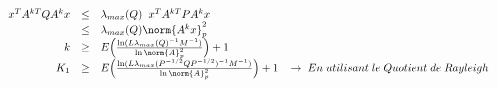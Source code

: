 \begin{equation}
\begin{array}{rrcl}
  & x^{T} A^{kT} Q A^{k} x   & \leq  &   \lambda_{max}(Q)\;\; x^{T} A^{kT} P A^{k} x \\
  
     &  &  \leq &  \lambda_{max}(Q) \norm{A^{k}x }^{2}_{p} \\
         
    
                & k &  \geq & E \Big ( \frac{ \ln (L \lambda_{max}(Q)^{-1} M^{-1})}{\ln \norm{A}^{2}_{p}} \Big ) +1\\
         
                 & K_{1} &  \geq & E \Big ( \frac{ \ln (L \lambda_{max}(P^{-1/2}QP^{-1/2})^{-1} M^{-1})}{\ln \norm{A}^{2}_{p}}\Big ) +1  \;\;\; \rightarrow \;En \; utilisant \; le \;Quotient\; de \; Rayleigh \\        
         
         
         
\end{array}
\end{equation}









